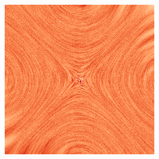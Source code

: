 \documentclass[10pt]{report}
\begin{document}
\begin{titlepage}
{\begin{figure}[!bh]
        \centering
        \includegraphics[width=0.6\textwidth]{figures/introduction/hero.png}
        \label{fig:exampleNedlec}
\end{figure}\vspace*{-1cm}
}

\author{
        \textsc{{{\LARGE Semester Project}}} \\[5pt]
        \small Department of Mathematics \\[5pt] \small ETH Zürich \\
        \vspace{0.5cm} \\
        \normalsize{} \\[5pt]
        \large{Alexander Pietak} \\ 
        \vspace{0.5cm} \\
        \begin{minipage}{0.5\textwidth}
                \centering
                \normalsize{} \\[5pt]
                \large{Dr.\ A.\ Adelmann (ETH, PSI)}\\
        \end{minipage}
        \begin{minipage}{0.5\textwidth}
                \centering
                \normalsize{} \\[5pt]
                \large{S.\ Mayani\ (ETH, PSI)}\\
        \end{minipage}
        \vspace{2cm} \\
        \today
        \vspace*{-20cm}
}
\date{}
\maketitle
\end{titlepage}
\end{document}
